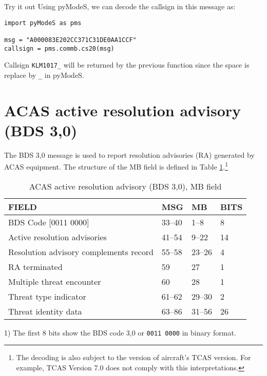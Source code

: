 \begin{notebox}{Try it out}
Using pyModeS, we can decode the callsign in this message as: 

\begin{verbatim}
import pyModeS as pms

msg = "A000083E202CC371C31DE0AA1CCF"
callsign = pms.commb.cs20(msg)
\end{verbatim}

Callsign \texttt{KLM1017\_} will be returned by the previous function since the space is replace by \texttt{\_} in pyModeS.
\end{notebox}


\clearpage

\section{ACAS active resolution advisory (BDS 3,0)}

The BDS 3,0 message is used to report resolution advisories (RA) generated by ACAS equipment. The structure of the MB field is defined in Table \ref{tb:bds20}.\footnote{The decoding is also subject to the version of aircraft's TCAS version. For example, TCAS Version 7.0 does not comply with this interpretations.}

\begin{table}[ht]
\centering
\caption{ACAS active resolution advisory (BDS 3,0), MB field}
\label{tb:bds20}
\begin{tabular}{|l|l|l|l|}
\hline
\textbf{FIELD} & \textbf{MSG} & \textbf{MB} & \textbf{BITS} \\ \hline
BDS Code {[}0011 0000{]} & 33--40 & 1--8 & 8 \\ \hline
Active resolution advisories & 41--54 & 9--22 & 14 \\ \hline
Resolution advisory complements record & 55--58 & 23--26 & 4 \\ \hline
RA terminated & 59 & 27 & 1 \\ \hline
Multiple threat encounter & 60 & 28 & 1 \\ \hline
Threat type indicator & 61--62 & 29--30 & 2 \\ \hline
Threat identity data & 63--86 & 31--56 & 26 \\ \hline
\end{tabular}
\end{table}


1) The first 8 bits show the BDS code 3,0 or \texttt{0011 0000} in binary format.


